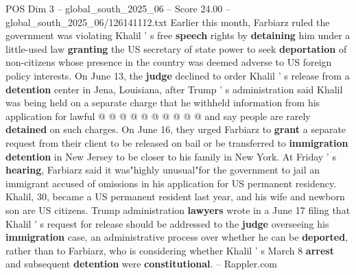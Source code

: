 \begin{textsample}{POS Dim 3 – global\_south\_2025\_06 – Score 24.00 – global\_south\_2025\_06/126141112.txt}
Earlier this month, Farbiarz ruled the government was violating Khalil ' s free \textbf{speech} rights by \textbf{detaining} him under a little-used law \textbf{granting} the US secretary of state power to seek \textbf{deportation} of non-citizens whose presence in the country was deemed adverse to US foreign policy interests.
On June 13, the \textbf{judge} declined to order Khalil ' s release from a \textbf{detention} center in Jena, Louisiana, after Trump ' s administration said Khalil was being held on a separate charge that he withheld information from his application for lawful @ @ @ @ @ @ @ @ @ @ and say people are rarely \textbf{detained} on such charges.
On June 16, they urged Farbiarz to \textbf{grant} a separate request from their client to be released on bail or be transferred to \textbf{immigration} \textbf{detention} in New Jersey to be closer to his family in New York.
At Friday ' s \textbf{hearing}, Farbiarz said it was"highly unusual"for the government to jail an immigrant accused of omissions in his application for US permanent residency.
Khalil, 30, became a US permanent resident last year, and his wife and newborn son are US citizens.
Trump administration \textbf{lawyers} wrote in a June 17 filing that Khalil ' s request for release should be addressed to the \textbf{judge} overseeing his \textbf{immigration} case, an administrative process over whether he can be \textbf{deported}, rather than to Farbiarz, who is considering whether Khalil ' s March 8 \textbf{arrest} and subsequent \textbf{detention} were \textbf{constitutional}. -- Rappler.com

\end{textsample}
